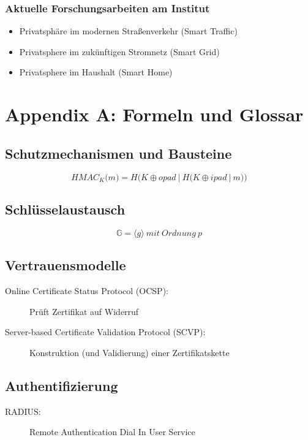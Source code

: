 \subsubsection{Aktuelle Forschungsarbeiten am Institut}
\begin{itemize}
	\item Privatsphäre im modernen Straßenverkehr (Smart Traffic)
	\item Privatsphere im zukünftigen Stromnetz (Smart Grid)
	\item Privatsphere im Haushalt (Smart Home)
\end{itemize}
\newpage



\section{Appendix A: Formeln und Glossar}

\subsection{Schutzmechanismen und Bausteine}
\begin{equation}
	HMAC_K\big(m\big) = H \Big( K \oplus opad~\big|~H \big( K \oplus ipad~|~m \big) \Big)
\end{equation}


\subsection{Schlüsselaustausch}
\begin{equation}
	\mathbb{G} = \langle g \rangle~mit~Ordnung~p
\end{equation}


\subsection{Vertrauensmodelle}
\begin{description}
	\item[Online Certificate Status Protocol (OCSP):] Prüft Zertifikat auf Widerruf
	\item[Server-based Certificate Validation Protocol (SCVP):] Konstruktion (und Validierung) einer Zertifikatskette
\end{description}


\subsection{Authentifizierung}
\begin{description}
	\item[RADIUS:] Remote Authentication Dial In User Service
\end{description}


